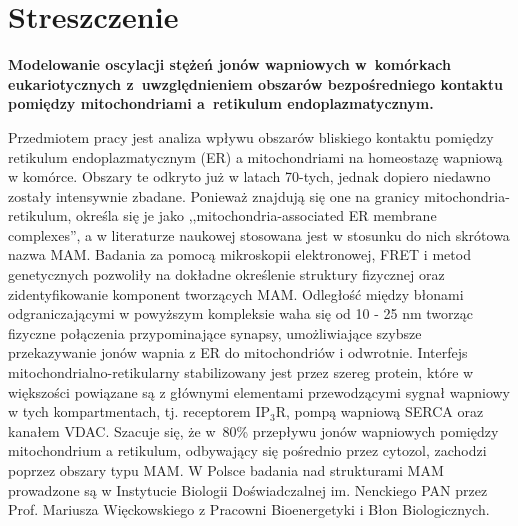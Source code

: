 \chapter{Streszczenie}



\begin{center}
{\large\textbf{ Modelowanie oscylacji stężeń jonów wapniowych w~komórkach eukariotycznych z~uwzględnieniem obszarów bezpośredniego kontaktu pomiędzy mitochondriami a~retikulum endoplazmatycznym.\\}}
\end{center}

\vspace{1cm}
Przedmiotem pracy jest analiza wpływu obszarów bliskiego kontaktu pomiędzy retikulum endoplazmatycznym (ER) a mitochondriami na homeostazę wapniową w komórce. Obszary te odkryto już w latach 70-tych, jednak dopiero niedawno zostały intensywnie zbadane. Ponieważ znajdują się one na granicy mitochondria-retikulum, określa się je jako ,,mitochondria-associated ER membrane complexes'', a w literaturze naukowej stosowana jest w stosunku do nich skrótowa nazwa MAM. Badania za pomocą mikroskopii elektronowej, FRET i metod genetycznych pozwoliły na dokładne określenie struktury fizycznej oraz zidentyfikowanie komponent tworzących MAM. Odległość między błonami odgraniczającymi w powyższym kompleksie waha się od 10 - 25 nm tworząc fizyczne połączenia przypominające synapsy, umożliwiające szybsze przekazywanie jonów wapnia z ER do mitochondriów i odwrotnie. Interfejs mitochondrialno-retikularny stabilizowany jest przez szereg protein, które w większości powiązane są z głównymi elementami przewodzącymi sygnał wapniowy w tych kompartmentach, tj. receptorem IP$_3$R, pompą wapniową SERCA oraz kanałem VDAC. Szacuje się, że w~80\% przepływu jonów wapniowych pomiędzy mitochondrium a retikulum, odbywający się pośrednio przez cytozol, zachodzi poprzez obszary typu MAM. W Polsce badania nad strukturami MAM prowadzone są w Instytucie Biologii Doświadczalnej im. Nenckiego PAN przez Prof. Mariusza Więckowskiego z Pracowni Bioenergetyki i Błon Biologicznych.


